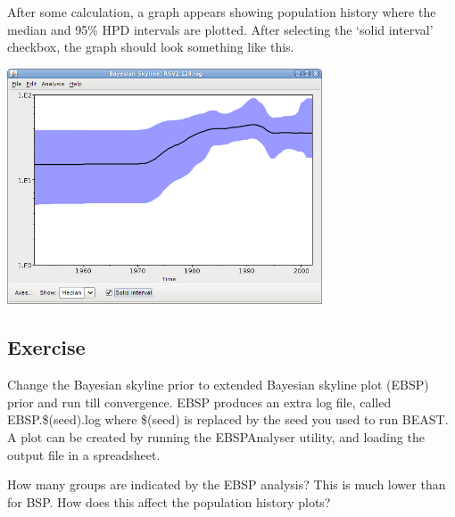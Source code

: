 \documentclass[12pt]{article}
\begin{document}
After some calculation, a graph appears showing population history where the median
and 95\% HPD intervals are plotted. After selecting the `solid interval' checkbox, the
graph should look something like this.

\begin{center}
\includegraphics[width=0.7\textwidth]{figures/tracerBSP3.png}
\end{center}


\subsection{Exercise}
Change the Bayesian skyline prior to extended Bayesian skyline plot (EBSP) prior and run
till convergence. EBSP produces an extra log file, called EBSP.\$(seed).log where \$(seed)
is replaced by the seed you used to run BEAST.
A plot can be created by running the EBSPAnalyser utility, and loading the output file
in a spreadsheet.

How many groups are indicated by the EBSP analysis?
This is much lower than for BSP. How does this affect the population history plots?

 

\end{document}
